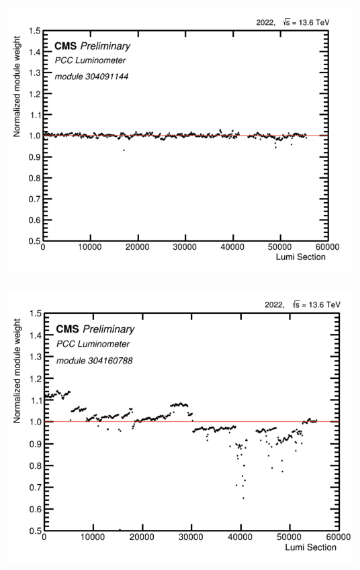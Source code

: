 \begin{figure}[ht]
  \centering
\begin{subfigure}{0.49\textwidth}
  \centering
  \includegraphics[width=1\linewidth]{ashish_thesis/2022_good_module_1.png}
  \label{fig:sub1}
\end{subfigure}%
\begin{subfigure}{0.49\textwidth}
  \centering
  \includegraphics[width=1\linewidth]{ashish_thesis/2022_bad_module_1.png}

\end{subfigure}
\end{figure}

